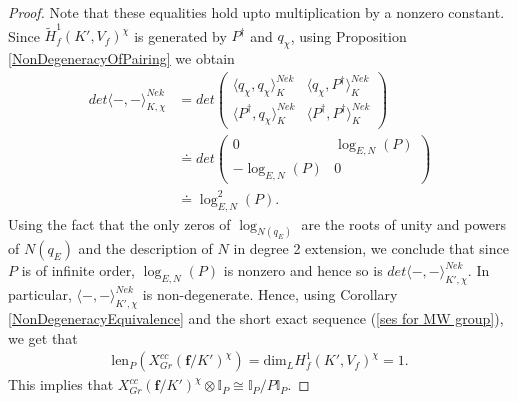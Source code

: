 \documentclass[10pt,a4paper]{amsart}
\newcommand{\I}{\mathbb{I}}
\newcommand{\f}{\mathbf{f}}
\begin{document}
\begin{proof}
    Note that these equalities hold upto multiplication by a nonzero constant. Since $\widetilde{H}^1_f(K',V_f)^\chi$ is generated by $P^\dagger$ and $q_\chi$, using Proposition \ref{NonDegeneracyOfPairing} we obtain
    \begin{align*}
        det \langle -,- \rangle^{Nek}_{K,\chi} & = det \begin{pmatrix}
            \langle q_\chi, q_\chi \rangle^{Nek}_K & \langle q_\chi, P^\dagger \rangle^{Nek}_K \\
            \langle P^\dagger,q_\chi \rangle^{Nek}_K & \langle P^\dagger, P^\dagger \rangle^{Nek}_K
        \end{pmatrix} \\
        & \doteq det \begin{pmatrix}
            0 & \log_{E,N}(P) \\
            -\log_{E,N}(P) & 0
        \end{pmatrix} \\
        & \doteq \log_{E,N}^2(P).
    \end{align*}
    Using the fact that the only zeros of $\log_{N(q_E)}$ are the roots of unity and powers of $N(q_E)$ and the description of $N$ in degree 2 extension, we conclude that since $P$ is of infinite order, $\log_{E,N}(P)$ is nonzero and hence so is $det \langle -,- \rangle^{Nek}_{K',\chi}$. In particular, $\langle -,- \rangle^{Nek}_{K',\chi}$ is non-degenerate.
    Hence, using Corollary \ref{NonDegeneracyEquivalence} and the short exact sequence (\ref{ses for MW group}), we get that
    \begin{align*}
        \mathrm{len}_P(X^{cc}_{Gr}(\f/K')^\chi) = \mathrm{dim}_L H^1_f(K',V_f)^\chi = 1.
    \end{align*}
    This implies that $X^{cc}_{Gr}(\f/K')^\chi \otimes \I_P \cong \I_P/P\I_P$.
\end{proof}
\end{document}
